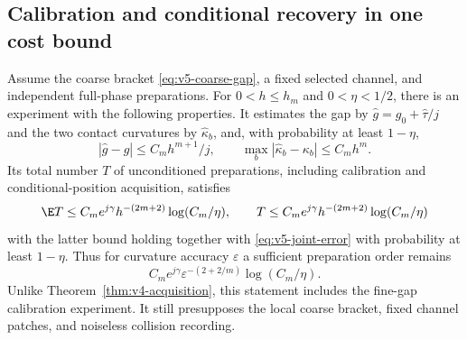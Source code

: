 \subsection{Calibration and conditional recovery in one cost bound}
\begin{theorem}
\label{thm:v5-self-calibration}
Assume the coarse bracket \eqref{eq:v5-coarse-gap}, a fixed selected
channel, and independent full-phase preparations. For $0<h\le h_m$
and $0<\eta<1/2$, there is an experiment with the following properties.
It estimates the gap by $\widehat g=g_0+\widehat\tau/j$ and the two
contact curvatures by $\widehat\kappa_b$, and, with probability at
least $1-\eta$,
\begin{equation}\label{eq:v5-joint-error}
 |\widehat g-g|\le C_mh^{m+1}/j,\qquad
 \max_b|\widehat\kappa_b-\kappa_b|\le C_mh^m.
\end{equation}
Its total number $T$ of unconditioned preparations, including calibration
and conditional-position acquisition, satisfies
\begin{equation}\label{eq:v5-joint-cost}
 \E T\le C_me^{j\gamma}h^{-(2m+2)}\log(C_m/\eta),\qquad
 T\le C_me^{j\gamma}h^{-(2m+2)}\log(C_m/\eta)
\end{equation}
with the latter bound holding together with \eqref{eq:v5-joint-error}
with probability at least $1-\eta$. Thus for curvature accuracy
$\varepsilon$ a sufficient preparation order remains
\[
       C_me^{j\gamma}\varepsilon^{-(2+2/m)}\log(C_m/\eta).
\]
Unlike Theorem~\ref{thm:v4-acquisition}, this statement includes the
fine-gap calibration experiment. It still presupposes the local coarse
bracket, fixed channel patches, and noiseless collision recording.
\end{theorem}

